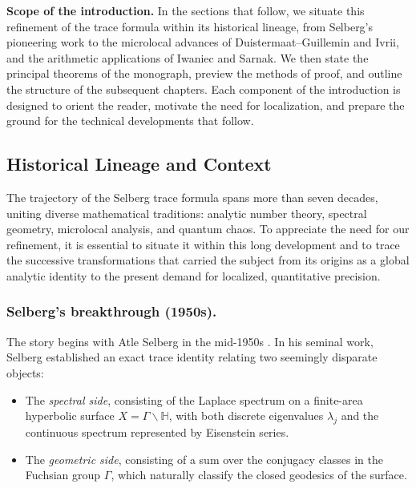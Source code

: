 \medskip

\noindent\textbf{Scope of the introduction.}
In the sections that follow, we situate this refinement of the trace formula
within its historical lineage, from Selberg’s pioneering work to the microlocal
advances of Duistermaat–Guillemin and Ivrii, and the arithmetic applications of
Iwaniec and Sarnak. We then state the principal theorems of the monograph,
preview the methods of proof, and outline the structure of the subsequent
chapters. Each component of the introduction is designed to orient the reader,
motivate the need for localization, and prepare the ground for the technical
developments that follow.



\subsection*{Historical Lineage and Context}

The trajectory of the Selberg trace formula spans more than seven decades,
uniting diverse mathematical traditions: analytic number theory, spectral
geometry, microlocal analysis, and quantum chaos. To appreciate the need for
our refinement, it is essential to situate it within this long development and
to trace the successive transformations that carried the subject from its
origins as a global analytic identity to the present demand for localized,
quantitative precision.

\subsubsection*{Selberg’s breakthrough (1950s).}
The story begins with Atle Selberg in the mid-1950s \cite{Selberg1956}. In his
seminal work, Selberg established an exact trace identity relating two
seemingly disparate objects:

\begin{itemize}
  \item The \emph{spectral side}, consisting of the Laplace spectrum on a
  finite-area hyperbolic surface $X=\Gamma\backslash\mathbb{H}$, with both
  discrete eigenvalues $\lambda_j$ and the continuous spectrum represented by
  Eisenstein series.

  \item The \emph{geometric side}, consisting of a sum over the conjugacy
  classes in the Fuchsian group $\Gamma$, which naturally classify the closed
  geodesics of the surface.
\end{itemize}

